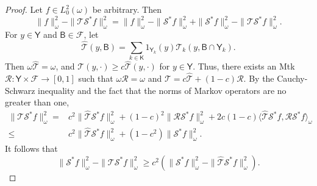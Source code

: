 \documentclass[12pt]{article}
\newcommand{\Y}{\mathsf{Y}}
\newcommand{\F}{\mathcal{F}}
\newcommand{\Mtk}{\mtkfont{T}}
\newcommand{\mtkfont}{\mathcal}
\begin{document}
\begin{proof}
	Let $f \in L_0^2(\omega)$ be arbitrary.
	Then
	\begin{equation} \label{eq:fnormdecomp-1}
		\|f\|_{\omega}^2 - \|\Mtk \mtkfont{S}^* f\|_{\omega}^2 = \|f\|_{\omega}^2 - \|\mtkfont{S}^*f\|_{\omega}^2 + \|\mtkfont{S}^*f\|_{\omega}^2 - \|\Mtk \mtkfont{S}^* f\|_{\omega}^2.
	\end{equation}
	For $y \in \Y$ and $\mathsf{B} \in \F$, let
	\[
	\hat{\Mtk}(y,\mathsf{B}) = \sum_{k \in \mathsf{K}} 1_{\Y_k}(y) \Mtk_k(y, \mathsf{B} \cap \Y_k).
	\]
	Then $\omega \hat{\Mtk} = \omega$, and $\Mtk(y, \cdot) \geq c \hat{\Mtk}(y, \cdot)$ for $y \in \Y$.
	Thus, there exists an Mtk $\mtkfont{R}: \Y \times \F \to [0,1]$ such that $\omega \mtkfont{R} = \omega$ and $\Mtk = c\hat{\Mtk} + (1-c) \mtkfont{R}$.
	{ By the Cauchy-Schwarz inequality and the fact that the norms of Markov operators are no greater than one,}
	\begin{equation} \nonumber
		\begin{aligned}
			\|\Mtk \mtkfont{S}^*f\|_{\omega}^2 =& c^2 \|\hat{\Mtk} \mtkfont{S}^* f\|_{\omega}^2 + (1-c)^2 \|\mtkfont{R} \mtkfont{S}^* f\|_{\omega}^2 + 2 c(1-c)  \langle \hat{\Mtk} \mtkfont{S}^* f, \mtkfont{R} \mtkfont{S}^* f \rangle_{\omega}  \\
			\leq & c^2 \|\hat{\Mtk} \mtkfont{S}^* f\|_{\omega}^2 + (1-c^2) \|\mtkfont{S}^* f\|_{\omega}^2.
		\end{aligned}
	\end{equation}
	It follows that
	\begin{equation} \label{ine:fnormdecomp-2}
		\|\mtkfont{S}^*f\|_{\omega}^2 - \|\Mtk \mtkfont{S}^* f\|_{\omega}^2 \geq c^2 \left( \|\mtkfont{S}^*f\|_{\omega}^2 - \|\hat{\Mtk } \mtkfont{S}^* f\|_{\omega}^2 \right).
	\end{equation}
	

\end{proof}
\end{document}
